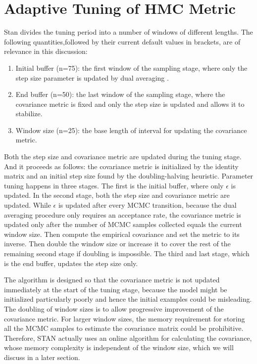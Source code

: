 \documentclass[12pt]{report}
\begin{document}
\section{Adaptive Tuning of HMC Metric}
Stan divides the tuning period into a number of windows of different lengths. The following quantities,followed by their current default values in brackets, are of relevance in this discussion: 

\begin{enumerate}
\item Initial buffer (n=75): the first window of the sampling stage, where only the step size parameter is updated by dual averaging .

\item End buffer (n=50): the last window of the sampling stage, where the covariance metric is fixed and only the step size is updated and allows it to stabilize.

\item Window size (n=25): the base length of interval for updating the covariance metric. 
\end{enumerate}

Both the step size and covariance metric are updated during the tuning stage. And it proceeds as follows: the covariance metric is initialized by the identity matrix and an initial step size found by the doubling-halving heuristic. Parameter tuning happens in three stages. The first is the initial buffer, where only $\epsilon $ is updated. In the second stage, both the step size and covariance metric are updated. While $\epsilon$ is updated after every MCMC transition, because the dual averaging procedure only requires an acceptance rate, the covariance metric is updated only after the number of MCMC samples collected equals the current window size. Then compute the empirical covariance and set the metric to its inverse. Then double the window size or increase it to cover the rest of the remaining second stage if doubling is impossible. The third and last stage, which is the end buffer, updates the step size only. 

The algorithm is designed so that the covariance metric is not updated immediately at the start of the tuning stage, because the model might be initialized particularly poorly and hence the initial examples could be misleading. The doubling of window sizes is to allow progressive improvement of the covariance metric. For larger window sizes, the memory requirement for storing all the MCMC samples to estimate the covariance matrix could be prohibitive. Therefore, STAN actually uses an online algorithm for calculating the covariance, whose memory complexity is independent of the window size, which we will discuss in a later section.
\end{document}
